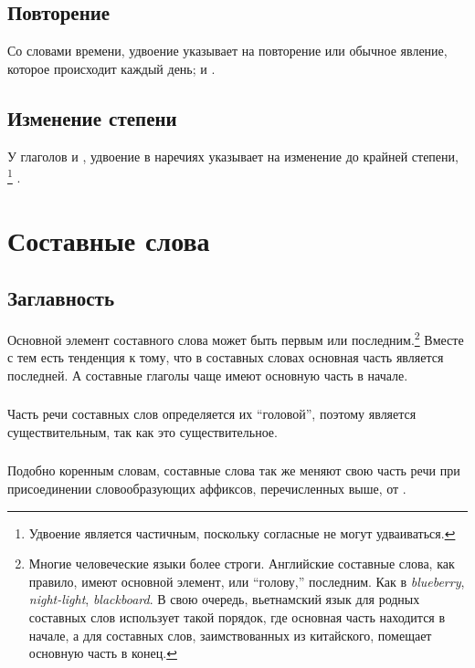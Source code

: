 \subsection{Повторение} Со словами времени, удвоение указывает на повторение или обычное явление,   которое происходит каждый день; и  .

\subsection{Изменение степени} У глаголов   и
 , удвоение в наречиях указывает на изменение до крайней степени,  
\footnote{Удвоение является частичным, поскольку согласные не могут удваиваться.} .\\

\newpage
\section{Составные слова}

\subsection{Заглавность} Основной элемент составного слова может быть первым или последним.\footnote{Многие человеческие языки более строги.  Английские составные слова, как правило, имеют основной элемент, или ``голову,'' последним. Как в \textit{blueberry},
\textit{night-light}, \textit{blackboard}.  В свою очередь, вьетнамский язык для родных составных слов использует такой порядок, где основная часть находится в начале, а для составных слов, заимствованных из китайского, помещает основную часть в конец.}  Вместе с тем есть тенденция к тому, что в составных словах основная часть является последней.  А составные глаголы чаще имеют основную часть в начале.

\subsubsection{} Часть речи составных слов определяется их ``головой'',
поэтому   является существительным, так как   это существительное.

\subsubsection{} Подобно коренным словам, составные слова так же меняют свою часть речи при присоединении словообразующих аффиксов, перечисленных выше,
  от  .



